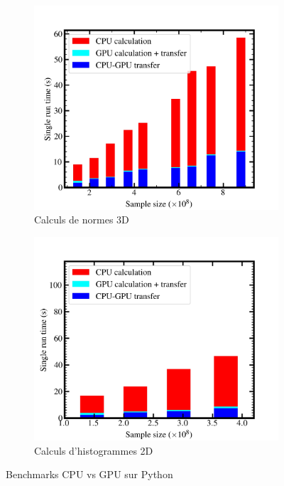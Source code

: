 \documentclass[13pt, a4paper]{extarticle}
\begin{document}
\begin{figure}[H]
  \centering
  \begin{subfigure}[b]{0.48\linewidth}
  \centering
  \includegraphics[width=\textwidth]{figs/annexe/benchmarks/bench_norm.jpg}
  \caption{Calculs de normes 3D}
  \end{subfigure}
  \begin{subfigure}[b]{0.48\linewidth}
    \centering
    \includegraphics[width=\textwidth]{figs/annexe/benchmarks/bench_hist.jpg}
    \caption{Calculs d'histogrammes 2D}
    \end{subfigure}
  \caption{Benchmarks CPU vs GPU sur Python}
  \label{fig:benchmarks}
\end{figure}
\end{document}
